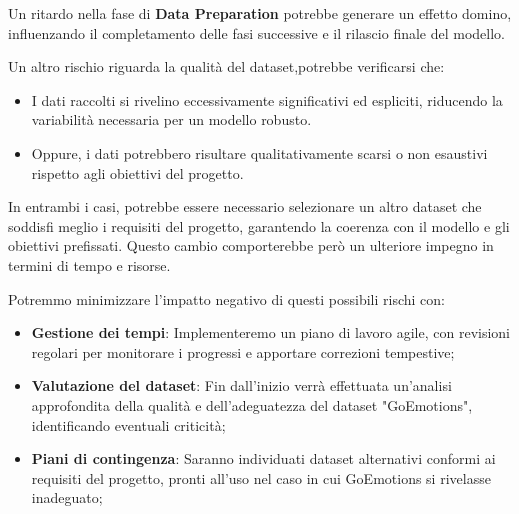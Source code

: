 \documentclass{article}
\begin{document}
Un ritardo nella fase di \textbf{Data Preparation} potrebbe generare un effetto domino, influenzando il completamento delle fasi successive e il rilascio finale del modello.

Un altro rischio riguarda la qualità del dataset,potrebbe verificarsi che:
\begin{itemize}
\item I dati raccolti si rivelino eccessivamente significativi ed espliciti, riducendo la variabilità necessaria per un modello robusto.
\item Oppure, i dati potrebbero risultare qualitativamente scarsi o non esaustivi rispetto agli obiettivi del progetto.
\end{itemize}
In entrambi i casi, potrebbe essere necessario selezionare un altro dataset che soddisfi meglio i requisiti del progetto, garantendo la coerenza con il modello e gli obiettivi prefissati. Questo cambio comporterebbe però un ulteriore impegno in termini di tempo e risorse.

Potremmo minimizzare l'impatto negativo di questi possibili rischi con:
\begin{itemize}
    \item \textbf{Gestione dei tempi}: Implementeremo un piano di lavoro agile, con revisioni regolari per monitorare i progressi e apportare correzioni tempestive;
    \item \textbf{Valutazione del dataset}: Fin dall'inizio verrà effettuata un'analisi approfondita della qualità e dell'adeguatezza del dataset "GoEmotions", identificando eventuali criticità;
    \item \textbf{Piani di contingenza}: Saranno individuati dataset alternativi conformi ai requisiti del progetto, pronti all'uso nel caso in cui GoEmotions si rivelasse inadeguato;
\end{itemize}
\end{document}

